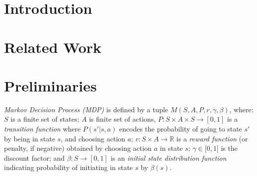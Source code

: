 \documentclass[runningheads,a4paper]{llncs}
\begin{document}
\section{Introduction}


\section{Related Work}



\section{Preliminaries}\label{sec:Preliminaries}
\textit{Markov Decision Process (MDP)} \citep{Puterman1994} is defined by a tuple $M(S, A, P, r, \gamma, \beta)$, where: $S$ is a finite set of states; $A$ is finite set of actions, $P: S \times A \times S \longrightarrow [0,1]$ is a \textit{transition function} where $P(s'|s,a)$ encodes the probability of going to state $s'$ by being in state $s$, and choosing action $a$; $r: S \times A \longrightarrow \mathbb{R}$ is a \textit{reward function} (or penalty, if negative) obtained by choosing action $a$ in state $s$; $\gamma \in [0, 1[$ is the discount factor; and $\beta: S \longrightarrow [0,1]$ is an \textit{initial state distribution function} indicating probability of initiating in state $s$ by $\beta(s)$.
\end{document}
